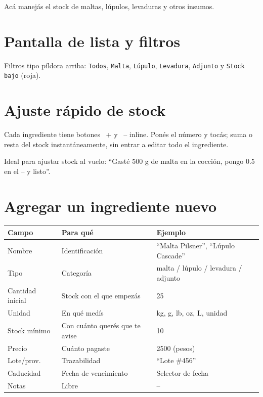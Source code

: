 \documentclass[11pt,a4paper]{report}
\newcommand{\appbtnsec}[1]{%
  \colorbox{black!10}{\footnotesize\sffamily\ #1}%
}
\begin{document}
Acá manejás el stock de maltas, lúpulos, levaduras y otros insumos.

\section{Pantalla de lista y filtros}

Filtros tipo píldora arriba: \texttt{Todos}, \texttt{Malta}, \texttt{Lúpulo}, \texttt{Levadura}, \texttt{Adjunto} y \texttt{Stock bajo} (roja).

\section{Ajuste rápido de stock}

Cada ingrediente tiene botones \appbtnsec{+} y \appbtnsec{--} inline. Ponés el número y tocás; suma o resta del stock instantáneamente, sin entrar a editar todo el ingrediente.

\begin{tipbox}
Ideal para ajustar stock al vuelo: ``Gasté 500 g de malta en la cocción, pongo 0.5 en el -- y listo''.
\end{tipbox}

\section{Agregar un ingrediente nuevo}

\begin{center}
\begin{tabular}{>{\ttfamily}lll}
\toprule
\rmfamily\bfseries Campo & \rmfamily\bfseries Para qué & \rmfamily\bfseries Ejemplo \\
\midrule
Nombre      & Identificación                     & ``Malta Pilsner'', ``Lúpulo Cascade'' \\
Tipo        & Categoría                          & malta / lúpulo / levadura / adjunto \\
Cantidad inicial & Stock con el que empezás      & 25 \\
Unidad      & En qué medís                      & kg, g, lb, oz, L, unidad \\
Stock mínimo & Con cuánto querés que te avise    & 10 \\
Precio      & Cuánto pagaste                    & 2500 (pesos) \\
Lote/prov.  & Trazabilidad                      & ``Lote \#456'' \\
Caducidad   & Fecha de vencimiento              & Selector de fecha \\
Notas       & Libre                             & -- \\
\bottomrule
\end{tabular}
\end{center}
\end{document}

